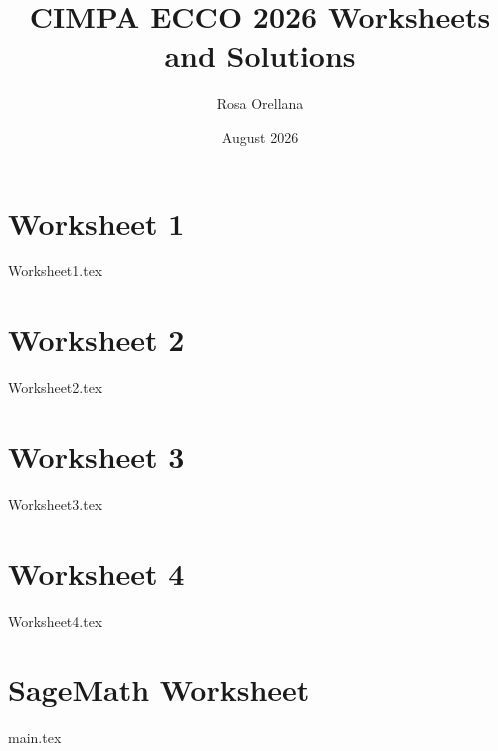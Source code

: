\documentclass{article}
\title{CIMPA ECCO 2026 Worksheets and Solutions}
\author{Rosa Orellana}
\date{August 2026}
\begin{document}
\setlength{\emergencystretch}{3em}

\maketitle
\tableofcontents

\clearpage
\section{Worksheet 1}
\begingroup
\let\maketitle\relax
{Worksheet1.tex}
\endgroup

\clearpage
\section{Worksheet 2}
\begingroup
\let\maketitle\relax
{Worksheet2.tex}
\endgroup

\clearpage
\section{Worksheet 3}
\begingroup
\let\maketitle\relax
{Worksheet3.tex}
\endgroup

\clearpage
\section{Worksheet 4}
\begingroup
\let\maketitle\relax
{Worksheet4.tex}
\endgroup

\clearpage
\section{SageMath Worksheet}
\begingroup
\let\maketitle\relax
{main.tex}
\endgroup
\end{document}
